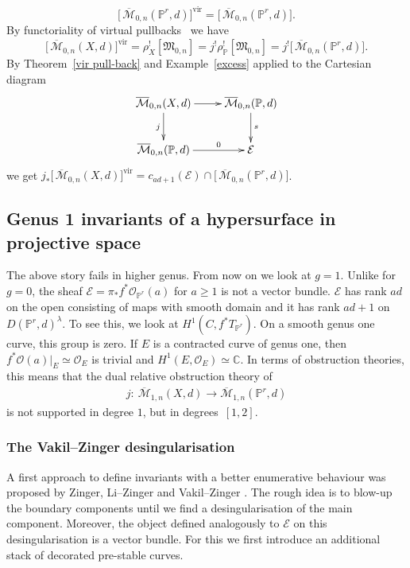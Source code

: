 \documentclass[pdftex]{sigma}
\numberwithin{equation}{section}
\newcommand{\vv}{\mathrm{vir}}
\newcommand{\PP}{\mathbb P}
\newcommand{\MM}[4]{\overline{\mathcal M}_{#1,#2}(#3,#4)}
\theoremstyle{plain}
\theoremstyle{definition}
\theoremstyle{remark}
\begin{document}
\[\big[\,\MM{0}{n}{\mathbb P^r}{d}\big]^{\vv}=\big[\,\MM{0}{n}{\mathbb P^r}{d}\big].
\]
By functoriality of virtual pullbacks~\cite{vir-pull} we have
\[
 \big[\,\MM{0}{n}{X}{d}\big]^\text{vir}=\rho_X^![\mathfrak M_{0,n}]=j^!\rho_{\mathbb P}^![\mathfrak M_{0,n}]=j^!\big[\,\MM{0}{n}{\mathbb P^r}{d}\big].
\]
By Theorem~\ref{vir pull-back} and Example~\ref{excess} applied to the Cartesian diagram
\[\xymatrix{\MM{0}{n}{X}{d}\ar[r]\ar[d]_j&\MM{0}{n}{\PP}{d}\ar[d]^s\\
\MM{0}{n}{\PP}{d}\ar[r]^-0 &\mathcal{E}
}
\]
we get $j_*\big[\,\MM{0}{n}{X}{d}\big]^{\vv}=c_{ad+1}(\mathcal{E})\cap\big[\,\MM{0}{n}{\mathbb P^r}{d}\big]$.

\subsection{Genus 1 invariants of a hypersurface in projective space}
The above story fails in higher genus. From now on we look at $g=1$. Unlike for $g=0$, the sheaf $\mathcal{E}=\pi_*f^*\mathcal O_{\mathbb P^r}(a)$ for $a\geq 1$ is not a vector bundle. $\mathcal{E}$ has rank $ad$ on the open consisting of maps with smooth domain and it has rank $ad+1$ on $D(\PP^r,d)^\lambda$. To see this, we look at $H^1(C,f^*T_{\mathbb P^r})$. On a smooth genus one curve, this group is zero. If $E$ is a contracted curve of genus one, then $f^*\mathcal O(a)|_E\simeq \mathcal O_E$ is trivial and $H^1(E,\mathcal O_E)\simeq \mathbb C$. In terms of obstruction theories, this means that the dual relative obstruction theory of \begin{gather*}j\colon \ \MM{1}{n}{X}{d}\to \MM{1}{n}{\mathbb P^r}{d}\end{gather*} is not supported in degree $1$, but in degrees~$[1,2]$.

\subsubsection{The Vakil--Zinger desingularisation}\label{vzdesing} A first approach to define invariants with a better enumerative behaviour was proposed by Zinger, Li--Zinger and Vakil--Zinger \cite{LZ,VZ,zingerstvsred,redgone,zingred}. The rough idea is to blow-up the boundary components until we find a desingularisation of the main component. Moreover, the object defined analogously to $\mathcal{E}$ on this desingularisation is a vector bundle. For this we first introduce an additional stack of decorated pre-stable curves.
\end{document}
